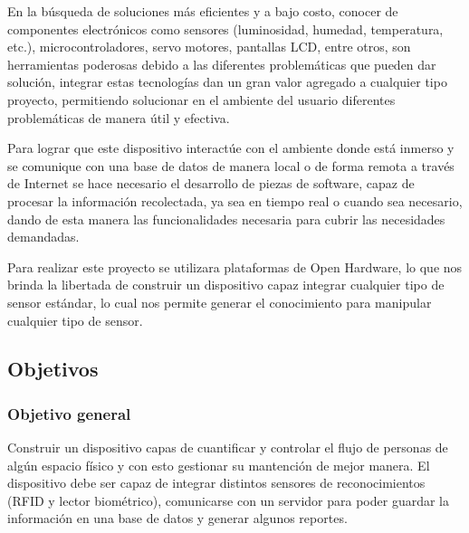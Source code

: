 
En la búsqueda de soluciones más eficientes y a bajo costo, conocer de componentes electrónicos como sensores (luminosidad, humedad, temperatura, etc.), microcontroladores, servo motores, pantallas LCD, entre otros, son herramientas poderosas debido a las diferentes problemáticas que pueden dar solución, integrar estas tecnologías dan un gran valor agregado a cualquier tipo proyecto, permitiendo solucionar en el ambiente del usuario diferentes problemáticas de manera útil y efectiva.

Para lograr que este dispositivo interactúe con el ambiente donde está inmerso y se comunique con una base de datos de manera local o de forma remota a través de Internet se hace necesario el desarrollo de piezas de software, capaz de procesar la información recolectada, ya sea en tiempo real o cuando sea necesario, dando de esta manera las funcionalidades necesaria para cubrir las necesidades demandadas.

Para realizar este proyecto se utilizara plataformas de Open Hardware, lo que nos brinda la libertada de construir un dispositivo capaz integrar cualquier tipo de sensor estándar, lo cual nos permite generar el conocimiento para manipular cualquier tipo de sensor.




\subsection{Objetivos}

\subsubsection{Objetivo general}

Construir un dispositivo capas de cuantificar y controlar el flujo de personas de algún espacio físico y con esto gestionar su mantención de mejor manera. El dispositivo debe ser capaz de integrar distintos sensores de reconocimientos (RFID y lector biométrico), comunicarse con un servidor para poder guardar la información en una base de datos y generar algunos reportes.
\vspace{-0.4cm}
